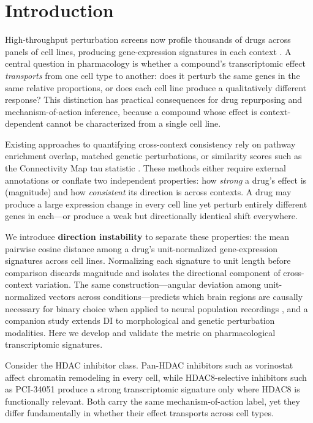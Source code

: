 \documentclass[11pt]{article}
\begin{document}
\section{Introduction}

High-throughput perturbation screens now profile thousands of drugs
across panels of cell lines, producing gene-expression signatures in
each context \citep{subramanian2017next,lamb2006connectivity}.  A central
question in pharmacology is whether a compound's transcriptomic effect
\emph{transports} from one cell type to another: does it perturb the
same genes in the same relative proportions, or does each cell line
produce a qualitatively different response?  This distinction has
practical consequences for drug repurposing and mechanism-of-action
inference, because a compound whose effect is context-dependent cannot
be characterized from a single cell line.

Existing approaches to quantifying cross-context consistency rely on
pathway enrichment overlap, matched genetic perturbations, or
similarity scores such as the Connectivity Map tau statistic
\citep{subramanian2017next}.  These methods either require external
annotations or conflate two independent properties: how \emph{strong}
a drug's effect is (magnitude) and how \emph{consistent} its
direction is across contexts.  A drug may produce a large expression
change in every cell line yet perturb entirely different genes in
each---or produce a weak but directionally identical shift everywhere.

We introduce \textbf{direction instability} to separate these
properties: the mean pairwise cosine distance among a drug's
unit-normalized gene-expression signatures across cell lines.
Normalizing each signature to unit length before comparison discards
magnitude and isolates the directional component of cross-context
variation.  The same construction---angular deviation among
unit-normalized vectors across conditions---predicts which brain regions
are causally necessary for binary choice when applied to neural
population recordings \citep{tower2026bracket}, and a companion study
\citep{tower2026atlas} extends DI to morphological and genetic
perturbation modalities.  Here we develop and validate the metric on
pharmacological transcriptomic signatures.

Consider the HDAC inhibitor class.  Pan-HDAC inhibitors such as
vorinostat affect chromatin remodeling in every cell, while
HDAC8-selective inhibitors such as PCI-34051 produce a strong
transcriptomic signature only where HDAC8 is functionally relevant.
Both carry the same mechanism-of-action label, yet they differ
fundamentally in whether their effect transports across cell types.
\end{document}
